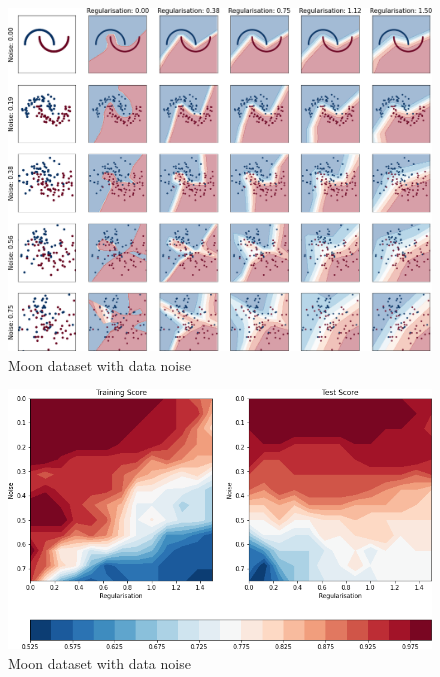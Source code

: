 \documentclass[9.5pt]{beamer}
\begin{document}
    \begin{frame}{}
        \bigskip
        \begin{figure}
            \centering
            \includegraphics[height=0.9\textheight]{images/boundaries}
            \caption{Moon dataset with data noise}
        \end{figure}
    \end{frame}
    \begin{frame}{}
        \bigskip
        \begin{figure}
            \centering
            \includegraphics[width=\linewidth]{images/moon_data}
            \caption{Moon dataset with data noise}
        \end{figure}
    \end{frame}
\end{document}

